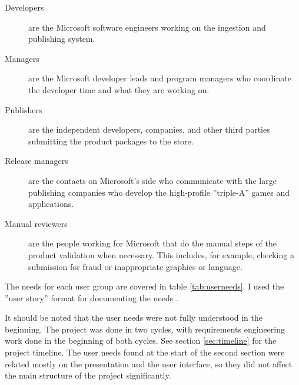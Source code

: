 \begin{description}
\item[Developers] are the Microsoft software engineers working on the ingestion and publishing system.
\item[Managers] are the Microsoft developer leads and program managers who coordinate the developer time and what they are working on.
\item[Publishers] are the independent developers, companies, and other third parties submitting the product packages to the store.
\item[Release managers] are the contacts on Microsoft's side who communicate with the large publishing companies who develop the high-profile ''triple-A'' games and applications.
\item[Manual reviewers] are the people working for Microsoft that do the manual steps of the product validation when necessary. This includes, for example, checking a submission for fraud or inappropriate graphics or language.
\end{description}

The needs for each user group are covered in table \ref{tab:userneeds}.
I used the ''user story'' format for documenting the needs \cite{cohn2004user}.

It should be noted that the user needs were not fully understood in the beginning. The project was done in two cycles, with requirements engineering work done in the beginning of both cycles. See section \ref{sec:timeline} for the project timeline. 
The user needs found at the start of the second section were related mostly on the presentation and the user interface, so they did not affect the main structure of the project significantly.


